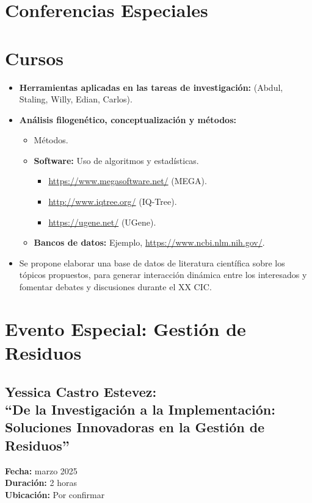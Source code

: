 \documentclass[11pt,a4paper]{article}
\begin{document}
\section{Conferencias Especiales}

\section{Cursos}
\begin{itemize}[leftmargin=*, label={--}]
    \item \textbf{Herramientas aplicadas en las tareas de investigación:} (Abdul, Staling, Willy, Edian, Carlos).
    \item \textbf{Análisis filogenético, conceptualización y métodos:}
    \begin{itemize}[leftmargin=1.5em, label={--}]
        \item Métodos.
        \item \textbf{Software:} Uso de algoritmos y estadísticas.
        \begin{itemize}[leftmargin=1.5em, label={$\bullet$}]
            \item \url{https://www.megasoftware.net/} (MEGA).
            \item \url{http://www.iqtree.org/} (IQ-Tree).
            \item \url{https://ugene.net/} (UGene).
        \end{itemize}
        \item \textbf{Bancos de datos:} Ejemplo, \url{https://www.ncbi.nlm.nih.gov/}.
    \end{itemize}
    \item Se propone elaborar una base de datos de literatura científica sobre los tópicos propuestos, para generar interacción dinámica entre los interesados y fomentar debates y discusiones durante el XX CIC.
\end{itemize}

\section{Evento Especial: Gestión de Residuos}
\subsection{Yessica Castro Estevez: \\
``De la Investigación a la Implementación: Soluciones Innovadoras en la Gestión de Residuos''}
\textbf{Fecha:} marzo 2025 \\
\textbf{Duración:} 2 horas \\
\textbf{Ubicación:} Por confirmar
\end{document}
